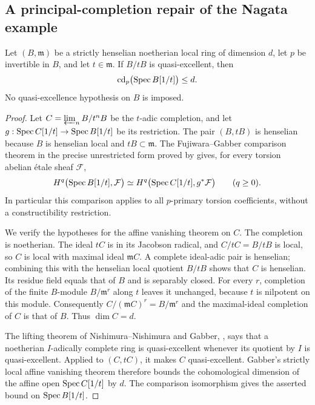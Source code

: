 \subsection{A principal-completion repair of the Nagata example}

\begin{proposition}
\label{A:principal-completion-bound}
Let $(B,\mathfrak m)$ be a strictly henselian noetherian local ring
of dimension $d$, let $p$ be invertible in $B$, and let
$t\in\mathfrak m$. If $B/tB$ is quasi-excellent, then
\[
 \operatorname{cd}_p\bigl(\operatorname{Spec} B[1/t]\bigr)\leq d.
\]
No quasi-excellence hypothesis on $B$ is imposed.
\end{proposition}
\begin{proof}
Let $C=\varprojlim_n B/t^nB$ be the $t$-adic completion, and let
$g:\operatorname{Spec} C[1/t]\to\operatorname{Spec} B[1/t]$ be its restriction. The pair
$(B,tB)$ is henselian because $B$ is henselian local and
$tB\subset\mathfrak m$. The Fujiwara--Gabber comparison theorem
in the precise unrestricted form proved by
\citet[Theorem 6.11, p.~50 of version 4]{A_BhattMathew2020}
gives, for every torsion abelian \'etale sheaf $\mathcal F$,
\[
 H^q\bigl(\operatorname{Spec} B[1/t],\mathcal F\bigr)
 \simeq
 H^q\bigl(\operatorname{Spec} C[1/t],g^*\mathcal F\bigr)
 \qquad(q\geq0).
\]
In particular this comparison applies to all $p$-primary torsion
coefficients, without a constructibility restriction.

We verify the hypotheses for the affine vanishing theorem on $C$.
The completion is noetherian. The ideal $tC$ is in its Jacobson
radical, and $C/tC=B/tB$ is local, so $C$ is local with maximal
ideal $\mathfrak m C$. A complete ideal-adic pair is henselian;
combining this with the henselian local quotient $B/tB$ shows that
$C$ is henselian. Its residue field equals that of $B$ and is
separably closed. For every $r$, completion of the finite
$B$-module $B/\mathfrak m^r$ along $t$ leaves it unchanged,
because $t$ is nilpotent on this module. Consequently
$C/(\mathfrak m C)^r=B/\mathfrak m^r$ and the maximal-ideal
completion of $C$ is that of $B$. Thus $\dim C=d$.

The lifting theorem of Nishimura--Nishimura and Gabber,
\citet[Theorem 5.1, p.~7]{A_KuranoShimomoto2019}, says that
a noetherian $I$-adically complete ring is quasi-excellent whenever
its quotient by $I$ is quasi-excellent. Applied to $(C,tC)$,
it makes $C$ quasi-excellent. Gabber's strictly local affine
vanishing theorem
\citep[Expos\'e XV, Corollary 1.2.2]{A_ILO2014}
therefore bounds the cohomological dimension of the affine open
$\operatorname{Spec} C[1/t]$ by $d$. The comparison isomorphism gives the
asserted bound on $\operatorname{Spec} B[1/t]$.
\end{proof}

